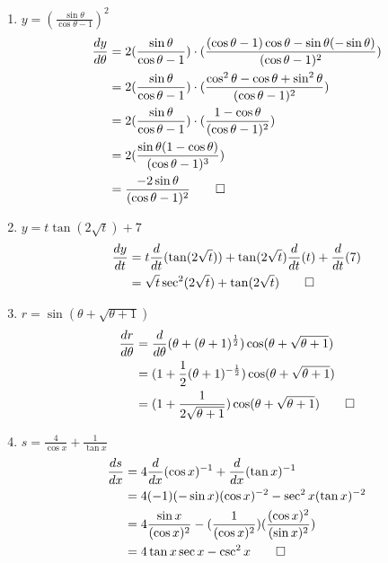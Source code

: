 \documentclass[12pt, a4paper]{article}
\begin{document}
\begin{enumerate}[Q\arabic*.]
\begin{enumerate}[(\alph*)]
      \item $\displaystyle y = (\frac{\sin\theta}{\cos\theta - 1})^2$
        \begin{align*}
          \frac{dy}{d\theta} &= 2(\frac{\sin\theta}{\cos\theta -1}) \cdot (\frac{(\cos\theta-1)\cos\theta - \sin\theta(-\sin\theta)}{(\cos\theta-1)^2}) \\
                        &= 2(\frac{\sin\theta}{\cos\theta-1})\cdot(\frac{\cos^2\theta-\cos\theta+\sin^2\theta}{(\cos\theta-1)^2}) \\
                        &= 2(\frac{\sin\theta}{\cos\theta-1})\cdot(\frac{1-\cos\theta}{(\cos\theta-1)^2}) \\
                        &= 2(\frac{\sin\theta(1-\cos\theta)}{(\cos\theta-1)^3}) \\
                        &= \frac{-2\sin\theta}{(\cos\theta-1)^2} \qed
        \end{align*}

      \item $\displaystyle y = t\tan(2\sqrt{t}) + 7$
        \begin{align*}
          \frac{dy}{dt} &= t \frac{d}{dt}(\tan(2\sqrt{t})) + \tan(2\sqrt{t})\frac{d}{dt}(t) + \frac{d}{dt}(7)\\
                        &= \sqrt{t}\sec^2(2\sqrt{t}) + \tan(2\sqrt{t}) \qed
        \end{align*}

      \item $\displaystyle r = \sin(\theta+\sqrt{\theta+1})$
        \begin{align*}
          \frac{dr}{d\theta} &= \frac{d}{d\theta}(\theta + (\theta+1)^\frac{1}{2})\cos(\theta+\sqrt{\theta+1})\\
                             &= (1 + \frac{1}{2}(\theta+1)^{-\frac{1}{2}})\cos(\theta+\sqrt{\theta+1}) \\
                        &= (1 + \frac{1}{2\sqrt{\theta+1}})\cos(\theta+\sqrt{\theta+1}) \qed
        \end{align*}

      \item $\displaystyle s = \frac{4}{\cos x} + \frac{1}{\tan x}$
        \begin{align*}
        \frac{ds}{dx} &= 4 \frac{d}{dx}(\cos x)^{-1} + \frac{d}{dx}(\tan x)^{-1} \\
                        &= 4(-1)(-\sin x)(\cos x)^{-2} - \sec^2 x(\tan x)^{-2}\\
                        &= 4\frac{\sin x}{(\cos x)^2} - (\frac{1}{(\cos x)^2})(\frac{(\cos x)^2}{(\sin x)^2})\\
                        &= 4\tan x\sec x - \csc^2 x \qed
        \end{align*}


\end{enumerate}
\end{enumerate}
\end{document}
